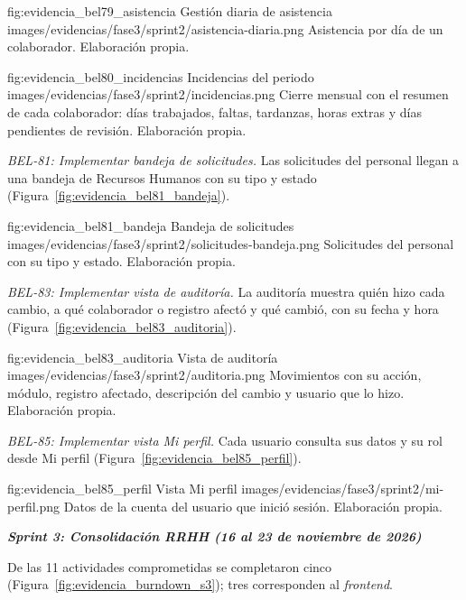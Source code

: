 \figuraEvidenciaCompacta
    {fig:evidencia_bel79_asistencia}
    {Gestión diaria de asistencia}
    {images/evidencias/fase3/sprint2/asistencia-diaria.png}
    {Asistencia por día de un colaborador. Elaboración propia.}

\figuraEvidenciaCompacta
    {fig:evidencia_bel80_incidencias}
    {Incidencias del periodo}
    {images/evidencias/fase3/sprint2/incidencias.png}
    {Cierre mensual con el resumen de cada colaborador: días trabajados, faltas, tardanzas, horas extras y días pendientes de revisión. Elaboración propia.}

\par\smallskip
\noindent\textit{BEL-81: Implementar bandeja de solicitudes.}
Las solicitudes del personal llegan a una bandeja de Recursos Humanos con su tipo y estado (Figura~\ref{fig:evidencia_bel81_bandeja}).

\figuraEvidenciaCompacta
    {fig:evidencia_bel81_bandeja}
    {Bandeja de solicitudes}
    {images/evidencias/fase3/sprint2/solicitudes-bandeja.png}
    {Solicitudes del personal con su tipo y estado. Elaboración propia.}

\clearpage
\par\smallskip
\noindent\textit{BEL-83: Implementar vista de auditoría.}
La auditoría muestra quién hizo cada cambio, a qué colaborador o registro afectó y qué cambió, con su fecha y hora (Figura~\ref{fig:evidencia_bel83_auditoria}).

\figuraEvidenciaCompacta
    {fig:evidencia_bel83_auditoria}
    {Vista de auditoría}
    {images/evidencias/fase3/sprint2/auditoria.png}
    {Movimientos con su acción, módulo, registro afectado, descripción del cambio y usuario que lo hizo. Elaboración propia.}

\par\smallskip
\noindent\textit{BEL-85: Implementar vista Mi perfil.}
Cada usuario consulta sus datos y su rol desde Mi perfil (Figura~\ref{fig:evidencia_bel85_perfil}).

\figuraEvidenciaCompacta
    {fig:evidencia_bel85_perfil}
    {Vista Mi perfil}
    {images/evidencias/fase3/sprint2/mi-perfil.png}
    {Datos de la cuenta del usuario que inició sesión. Elaboración propia.}


\par\medskip
\noindent\textbf{\textit{Sprint 3: Consolidación RRHH (16 al 23 de noviembre de 2026)}}\par
\nobreak
De las 11 actividades comprometidas se completaron cinco (Figura~\ref{fig:evidencia_burndown_s3}); tres corresponden al \textit{frontend}.

